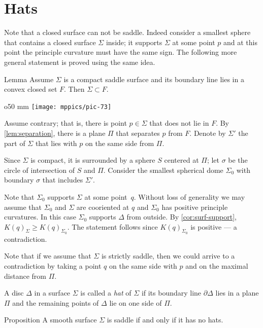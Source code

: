 \section*{Hats}

Note that a closed surface can not be saddle.
Indeed consider a smallest sphere that contains a closed surface $\Sigma$ inside;
it supports $\Sigma$ at some point $p$ and at this point the principle curvature must have the same sign.
The following more general statement  is proved using the same idea.

\begin{thm}{Lemma}\label{lem:convex-saddle}
Assume $\Sigma$ is a compact saddle surface and its boundary line lies in a convex closed set $F$.
Then $\Sigma\subset F$.
\end{thm}

\begin{wrapfigure}{o}{50 mm}
\vskip-0mm
\centering
\texttt{[image: mppics/pic-73]}
\vskip0mm
\end{wrapfigure}

Assume contrary; that is, there is point $p\in \Sigma$ that does not lie in $F$.
By \ref{lem:separation}, there is a plane $\Pi$ that separates $p$ from $F$.
Denote by $\Sigma'$ the part of $\Sigma$ that lies with $p$ on the same side from $\Pi$.

Since $\Sigma$ is compact, it is surrounded by a sphere $S$ centered at $\Pi$;
let $\sigma$ be the circle of intersection of $S$ and $\Pi$.
Consider the smallest spherical dome $\Sigma_0$ with boundary $\sigma$ that includes $\Sigma'$.

Note that $\Sigma_0$ supports $\Sigma$ at some point~$q$.
Without loss of generality we may assume that $\Sigma_0$ and $\Sigma$ are cooriented at $q$ and $\Sigma_0$ has positive principle curvatures.
In this case $\Sigma_0$ supports $\Delta$ from outside.
By \ref{cor:surf-support}, $K(q)_\Sigma\ge K(q)_{\Sigma_0}$.
The statement follows since $K(q)_{\Sigma_0}$ is positive --- a contradiction.
\qeds

Note that if we assume that $\Sigma$ is strictly saddle, then we could arrive to a contradiction by taking a point $q$ on the same side with $p$ and on the maximal distance from $\Pi$.

A disc $\Delta$ in a surface $\Sigma$ is called a \emph{hat} of $\Sigma$
if its boundary line $\partial\Delta$ lies in a plane $\Pi$ and the remaining points of $\Delta$ lie on one side of $\Pi$.

\begin{thm}{Proposition}\label{prop:hat}
A smooth surface $\Sigma$ is saddle if and only if it has no hats.
\end{thm}

